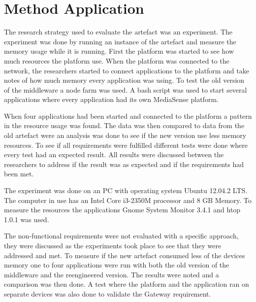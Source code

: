 \section{Method Application}
The research strategy used to evaluate the artefact was an experiment. The experiment was done by running an instance of the artefact and measure the memory usage while it is running. First the platform was started to see how much resources the platform use. When the platform was connected to the network, the researchers started to connect applications to the platform and take notes of how much memory every application was using. To test the old version of the middleware a node farm was used. A bash script was used to start several applications where every application had its own MediaSense platform. 

When four applications had been started and connected to the platform a pattern in the resource usage was found. The data was then compared to data from the old artefact were an analysis was done to see if the new version use less memory resources. To see if all requirements were fulfilled different tests were done where every test had an expected result. All results were discussed between the researchers to address if the result was as expected and if the requirements had been met. 

The experiment was done on an PC with operating system Ubuntu 12.04.2 LTS. The computer in use has an Intel Core i3-2350M processor and 8 GB Memory. To measure the resources the applications Gnome System Monitor 3.4.1 \cite{gnomesm} and htop 1.0.1 \cite{htop} was used.

The non-functional requirements were not evaluated with a specific approach, they were discussed as the experiments took place to see that they were addressed and met. To measure if the new artefact consumed less of the devices memory one to four applications were run with both the old version of the middleware and the reengineered version. The results were noted and a comparison was then done. A test where the platform and the application ran on separate devices was also done to validate the Gateway requirement.

